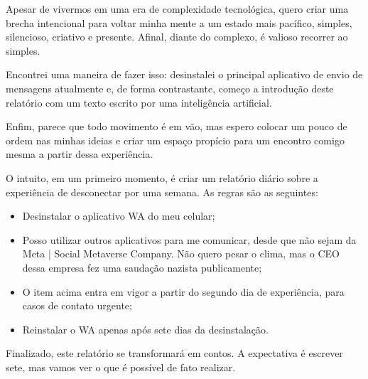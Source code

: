 Apesar de vivermos em uma era de complexidade tecnológica, quero criar uma brecha intencional para voltar minha mente a um estado mais pacífico, simples, silencioso, criativo e presente. Afinal, diante do complexo, é valioso recorrer ao simples.

Encontrei uma maneira de fazer isso: desinstalei o principal aplicativo de envio de mensagens atualmente e, de forma contrastante, começo a introdução deste relatório com um texto escrito por uma inteligência artificial.

Enfim, parece que todo movimento é em vão, mas espero colocar um pouco de ordem nas minhas ideias e criar um espaço propício para um encontro comigo mesma a partir dessa experiência.

O intuito, em um primeiro momento, é criar um relatório diário sobre a experiência de desconectar por uma semana. As regras são as seguintes:
\begin{itemize}
	\item Desinstalar o aplicativo WA do meu celular;
	\item Posso utilizar outros aplicativos para me comunicar, desde que não sejam da Meta | Social Metaverse Company. Não quero pesar o clima, mas o CEO dessa empresa fez uma saudação nazista publicamente;
	\item O item acima entra em vigor a partir do segundo dia de experiência, para casos de contato urgente;
	\item Reinstalar o WA apenas após sete dias da desinstalação.
\end{itemize}

Finalizado, este relatório se transformará em contos. A expectativa é escrever sete, mas vamos ver o que é possível de fato realizar.